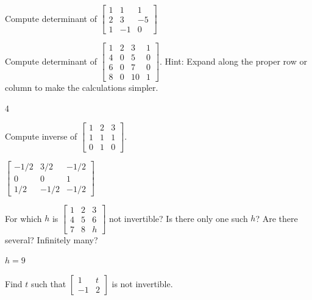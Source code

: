 \begin{exercise}\ansMark%
Compute determinant of
$\left[ \begin{smallmatrix}
1 & 1 & 1 \\
2 & 3 & -5 \\
1 & -1 & 0
\end{smallmatrix}\right]$
\end{exercise}

\begin{exercise}
Compute determinant of
$\left[ \begin{smallmatrix}
1 & 2 & 3 & 1 \\
4 & 0 & 5 & 0 \\
6 & 0 & 7 & 0 \\
8 & 0 & 10 & 1
\end{smallmatrix} \right]$.  Hint: Expand along the proper row or column to
make the calculations simpler.
\end{exercise}
\comboSol{%
}
{%
4
}

\begin{exercise}
Compute inverse of
$\left[ \begin{smallmatrix}
1 & 2 & 3 \\
1 & 1 & 1 \\
0 & 1 & 0
\end{smallmatrix} \right]$.
\end{exercise}
\comboSol{%
}
{%
$\left[\begin{smallmatrix} -1/2 & 3/2 & -1/2 \\ 0 & 0 & 1 \\ 1/2 & -1/2 & -1/2 \end{smallmatrix}\right]$
}

\begin{exercise}
For which $h$ is
$\left[ \begin{smallmatrix}
1 & 2 & 3 \\
4 & 5 & 6 \\
7 & 8 & h
\end{smallmatrix} \right]$
not invertible?  Is there only one such $h$?  Are there several?  Infinitely
many?
\end{exercise}
\comboSol{%
}
{%
$h=9$
}


\begin{exercise}\ansMark%
Find $t$ such that
$\left[ \begin{smallmatrix}
1 & t \\
-1 & 2
\end{smallmatrix}\right]$
is not invertible.
\end{exercise}

